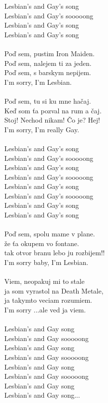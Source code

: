 \begin{multicols}{2}
Lesbian's and Gay's song\\
Lesbian's and Gay's sooooong\\
Lesbian's and Gay's song\\
Lesbian's and Gay's song\\
\\
Poď sem, pustim Iron Maiden.\\
Poď sem, nalejem ti za jeden.\\
Poď sem, s barskym nepijem.\\
I'm sorry, I'm Lesbian.\\
\\
Poď sem, tu si ku mne hačaj.\\
Keď som ťa pozval na rum a čaj.\\
Stoj! Nechod nikam! Čo je? Hej!\\
I'm sorry, I'm really Gay.\\
\\
Lesbian's and Gay's song\\
Lesbian's and Gay's sooooong\\
Lesbian's and Gay's song\\
Lesbian's and Gay's sooooong\\
Lesbian's and Gay's song\\
Lesbian's and Gay's sooooong\\
Lesbian's and Gay's song\\
Lesbian's and Gay's song\\
\columnbreak
\\
Poď sem, spolu mame v plane.\\
že ťa okupem vo fontane.\\
tak otvor branu lebo ju rozbijem!!\\
I'm sorry baby, I'm Lesbian.\\
\\
Viem, neopakuj mi to stale\\
ja som vyrastol na Death Metale,\\
ja takymto veciam rozumiem.\\
I'm sorry ...ale ved ja viem.\\
\\
Lesbian's and Gay song\\
Lesbian's and Gay sooooong\\
Lesbian's and Gay song\\
Lesbian's and Gay sooooong\\
Lesbian's and Gay song\\
Lesbian's and Gay sooooong\\
Lesbian's and Gay song\\
Lesbian's and Gay song...\\
\end{multicols}